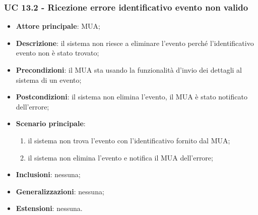 \subsubsection{UC 13.2 - Ricezione errore identificativo evento non valido} \label{sec:UC11.2}
    \begin{itemize}
        \item \textbf{Attore principale}: MUA;
        \item \textbf{Descrizione}: il sistema non riesce a eliminare l'evento perché l'identificativo evento non è stato trovato;
        \item \textbf{Precondizioni}: il MUA sta usando la funzionalità d'invio dei dettagli al sistema di un evento;
        \item \textbf{Postcondizioni}: il sistema non elimina l'evento, il MUA è stato notificato dell'errore;
        \item \textbf{Scenario principale}:
            \begin{enumerate}
                \item il sistema non trova l'evento con l'identificativo fornito dal MUA;
                \item il sistema non elimina l'evento e notifica il MUA dell'errore;
            \end{enumerate}
        \item \textbf{Inclusioni}: nessuna;
        \item \textbf{Generalizzazioni}: nessuna;
        \item \textbf{Estensioni}: nessuna.
    \end{itemize}
